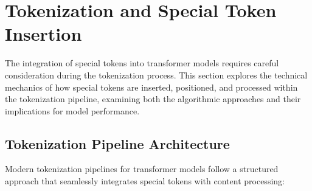 \section{Tokenization and Special Token Insertion}

The integration of special tokens into transformer models requires careful consideration during the tokenization process. This section explores the technical mechanics of how special tokens are inserted, positioned, and processed within the tokenization pipeline, examining both the algorithmic approaches and their implications for model performance.
\begin{comment}
Feedback: This is a clear introduction. To set the stage even better, you could add a sentence that frames the importance of this step. For example: "This process is more than a technical preliminary; it is where the model's understanding of structure and task begins. Errors or inefficiencies at this stage can have cascading effects on the model's performance."
\end{comment}

\subsection{Tokenization Pipeline Architecture}

Modern tokenization pipelines for transformer models follow a structured approach that seamlessly integrates special tokens with content processing:

